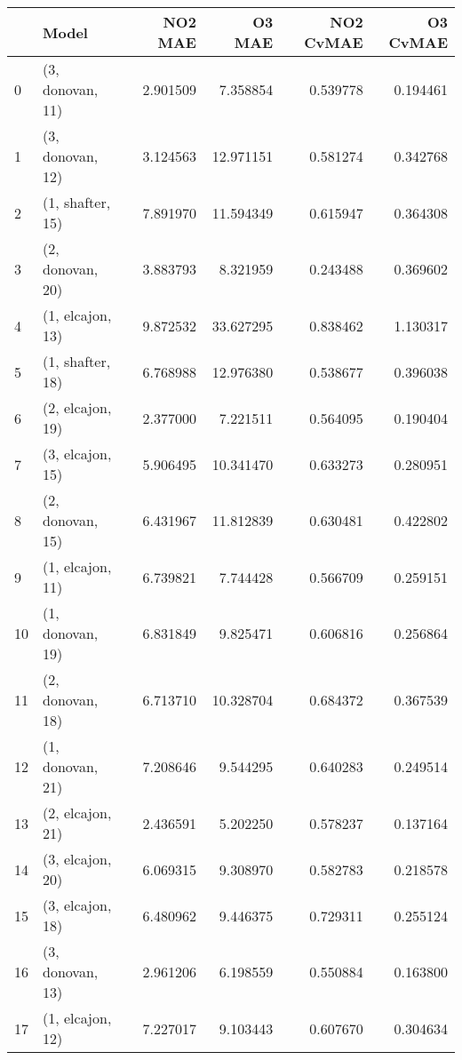 \begin{tabular}{llrrrr}
\toprule
{} &             Model &   NO2 MAE &     O3 MAE &  NO2 CvMAE &  O3 CvMAE \\
\midrule
0  &  (3, donovan, 11) &  2.901509 &   7.358854 &   0.539778 &  0.194461 \\
1  &  (3, donovan, 12) &  3.124563 &  12.971151 &   0.581274 &  0.342768 \\
2  &  (1, shafter, 15) &  7.891970 &  11.594349 &   0.615947 &  0.364308 \\
3  &  (2, donovan, 20) &  3.883793 &   8.321959 &   0.243488 &  0.369602 \\
4  &  (1, elcajon, 13) &  9.872532 &  33.627295 &   0.838462 &  1.130317 \\
5  &  (1, shafter, 18) &  6.768988 &  12.976380 &   0.538677 &  0.396038 \\
6  &  (2, elcajon, 19) &  2.377000 &   7.221511 &   0.564095 &  0.190404 \\
7  &  (3, elcajon, 15) &  5.906495 &  10.341470 &   0.633273 &  0.280951 \\
8  &  (2, donovan, 15) &  6.431967 &  11.812839 &   0.630481 &  0.422802 \\
9  &  (1, elcajon, 11) &  6.739821 &   7.744428 &   0.566709 &  0.259151 \\
10 &  (1, donovan, 19) &  6.831849 &   9.825471 &   0.606816 &  0.256864 \\
11 &  (2, donovan, 18) &  6.713710 &  10.328704 &   0.684372 &  0.367539 \\
12 &  (1, donovan, 21) &  7.208646 &   9.544295 &   0.640283 &  0.249514 \\
13 &  (2, elcajon, 21) &  2.436591 &   5.202250 &   0.578237 &  0.137164 \\
14 &  (3, elcajon, 20) &  6.069315 &   9.308970 &   0.582783 &  0.218578 \\
15 &  (3, elcajon, 18) &  6.480962 &   9.446375 &   0.729311 &  0.255124 \\
16 &  (3, donovan, 13) &  2.961206 &   6.198559 &   0.550884 &  0.163800 \\
17 &  (1, elcajon, 12) &  7.227017 &   9.103443 &   0.607670 &  0.304634 \\
\bottomrule
\end{tabular}
